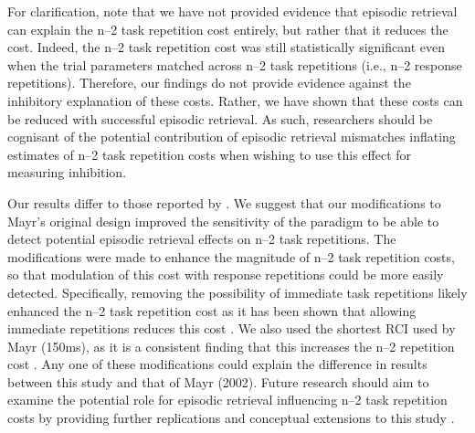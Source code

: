 \documentclass[a4paper, doc, natbib]{apa6}
\begin{document}
For clarification, note that we have not provided evidence that episodic retrieval can explain the n--2 task repetition cost entirely, but rather that it reduces the cost. Indeed, the n--2 task repetition cost was still statistically significant even when the trial parameters matched across n--2 task repetitions (i.e., n--2 response repetitions). Therefore, our findings do not provide evidence against the inhibitory explanation of these costs. Rather, we have shown that these costs can be reduced with successful episodic retrieval. As such, researchers should be cognisant of the potential contribution of episodic retrieval mismatches inflating estimates of n--2 task repetition costs when wishing to use this effect for measuring inhibition.

Our results differ to those reported by \cite{Mayr2002}. We suggest that our modifications to Mayr's original design improved the sensitivity of the paradigm to be able to detect potential episodic retrieval effects on n--2 task repetitions. The modifications were made to enhance the magnitude of n--2 task repetition costs, so that modulation of this cost with response repetitions could be more easily detected. Specifically, removing the possibility of immediate task repetitions likely enhanced the n--2 task repetition cost as it has been shown that allowing immediate repetitions reduces this cost \citep{Philipp2006}. We also used the shortest RCI used by Mayr (150ms), as it is a consistent finding that this increases the n--2 repetition cost \cite{Gade2005, Grange2009, Mayr2000, Mayr2002}. Any one of these modifications could explain the difference in results between this study and that of Mayr (2002). Future research should aim to examine the potential role for episodic retrieval influencing n--2 task repetition costs by providing further replications and conceptual extensions to this study \citep{OpenScienceCollaboration2015}.






\end{document}
